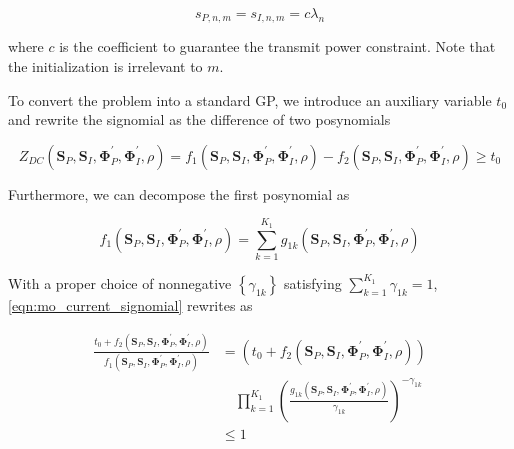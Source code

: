 \begin{equation}\label{eqn:mo_initial_amplitude}
  {s_{P,n,m}} = {s_{I,n,m}} = c{\lambda _n}
\end{equation}

where $c$ is the coefficient to guarantee the transmit power constraint. Note that the initialization is irrelevant to $m$.

To convert the problem into a standard GP, we introduce an auxiliary variable ${t_0}$ and rewrite the signomial as the difference of two posynomials

\begin{equation}\label{eqn:mo_current_signomial}
  {Z_{DC}}\left( {{{\mathbf{S}}_P},{{\mathbf{S}}_I},{\mathbf{\Phi }}_P^\prime ,{\mathbf{\Phi }}_I^\prime ,\rho } \right) = {f_1}\left( {{{\mathbf{S}}_P},{{\mathbf{S}}_I},{\mathbf{\Phi }}_P^\prime ,{\mathbf{\Phi }}_I^\prime ,\rho } \right) - {f_2}\left( {{{\mathbf{S}}_P},{{\mathbf{S}}_I},{\mathbf{\Phi }}_P^\prime ,{\mathbf{\Phi }}_I^\prime ,\rho } \right) \geqslant {t_0}
\end{equation}

Furthermore, we can decompose the first posynomial as

\begin{equation}\label{eqn:mo_current_posynomial}
  {f_1}\left( {{{\mathbf{S}}_P},{{\mathbf{S}}_I},{\mathbf{\Phi }}_P^\prime ,{\mathbf{\Phi }}_I^\prime ,\rho } \right) = \sum\limits_{k = 1}^{{K_1}} {{g_{1k}}} \left( {{{\mathbf{S}}_P},{{\mathbf{S}}_I},{\mathbf{\Phi }}_P^\prime ,{\mathbf{\Phi }}_I^\prime ,\rho } \right)
\end{equation}

With a proper choice of nonnegative $\left\{ {{\gamma _{1k}}} \right\}$ satisfying $\sum\nolimits_{k = 1}^{{K_1}} {{\gamma _{1k}}}  = 1$, \eqref{eqn:mo_current_signomial} rewrites as

\begin{align}\label{eqn:mo_current_signomial_rewritten}
  \frac{{{t_0} + {f_2}\left( {{{\mathbf{S}}_P},{{\mathbf{S}}_I},{\mathbf{\Phi }}_P^\prime ,{\mathbf{\Phi }}_I^\prime ,\rho } \right)}}{{{f_1}\left( {{{\mathbf{S}}_P},{{\mathbf{S}}_I},{\mathbf{\Phi }}_P^\prime ,{\mathbf{\Phi }}_I^\prime ,\rho } \right)}} &= \left( {{t_0} + {f_2}\left( {{{\mathbf{S}}_P},{{\mathbf{S}}_I},{\mathbf{\Phi }}_P^\prime ,{\mathbf{\Phi }}_I^\prime ,\rho } \right)} \right) \nonumber \\
  &\quad \prod\limits_{k = 1}^{{K_1}} {{{\left( {\frac{{{g_{1k}}\left( {{{\mathbf{S}}_P},{{\mathbf{S}}_I},{\mathbf{\Phi }}_P^\prime ,{\mathbf{\Phi }}_I^\prime ,\rho } \right)}}{{{\gamma _{1k}}}}} \right)}^{ - {\gamma _{1k}}}}} \\
  &\leqslant 1
\end{align}

